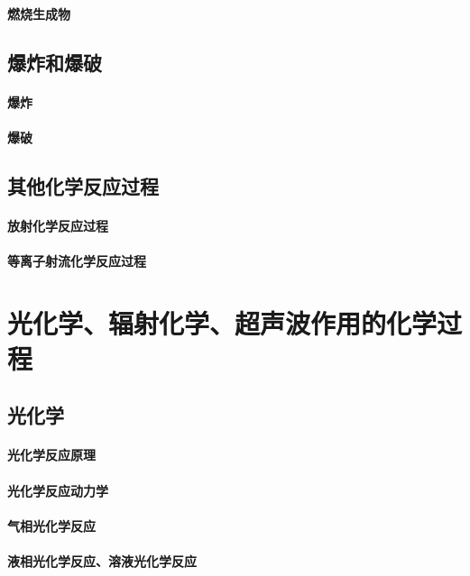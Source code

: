\documentclass[UTF8]{../03-Chemistry}
\begin{document}
    \subsubsection{燃烧生成物}

\section{爆炸和爆破}
    \subsubsection{爆炸}
    \subsubsection{爆破}

\section{其他化学反应过程}
    \subsubsection{放射化学反应过程}
    \subsubsection{等离子射流化学反应过程}





\chapter{光化学、辐射化学、超声波作用的化学过程}
\section{光化学}
    \subsubsection{光化学反应原理}
    \subsubsection{光化学反应动力学}
    \subsubsection{气相光化学反应}
    \subsubsection{液相光化学反应、溶液光化学反应}
\end{document}
